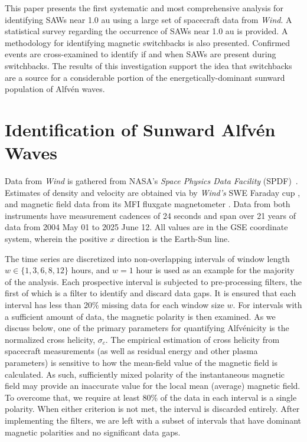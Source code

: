 \documentclass[twocolumn, times]{aastex631}
\begin{document}
This paper presents the first systematic and most comprehensive analysis for identifying SAWs near 1.0 au using a large set of spacecraft data from \emph{Wind}. A statistical survey regarding the occurrence of SAWs near 1.0 au is provided. A methodology for identifying magnetic switchbacks is also presented. Confirmed events are cross-examined to identify if and when SAWs are present during switchbacks. The results of this investigation support the idea that switchbacks are a source for a considerable portion of the energetically-dominant sunward population of Alfv\'en waves.

\section{Identification of Sunward Alfv\'en Waves} \label{sec:alfven}
Data from \emph{Wind} is gathered from NASA's \emph{Space Physics Data Facility} (SPDF)~\citep{papitashvili20}. Estimates of density and velocity are obtained via by \emph{Wind's} SWE Faraday cup \citep{lin95}, and magnetic field data from its MFI fluxgate magnetometer \citep{lepping95}. Data from both instruments have measurement cadences of 24 seconds and span over 21 years of data from 2004 May 01 to 2025 June 12. All values are in the GSE coordinate system, wherein the positive $x$ direction is the Earth-Sun line.

The time series are discretized into non-overlapping intervals of window length $w \in \{1, 3, 6, 8, 12\}$ hours, and $w = 1$ hour is used as an example for the majority of the analysis. Each prospective interval is subjected to pre-processing filters, the first of which is a filter to identify and discard data gaps. It is ensured that each interval has less than 20\% missing data for each window size $w$. For intervals with a sufficient amount of data, the magnetic polarity is then examined. As we discuss below, one of the primary parameters for quantifying Alfv\'enicity is the normalized cross helicity, $\sigma_c$. The empirical estimation of cross helicity from spacecraft measurements (as well as residual energy and other plasma parameters) is sensitive to how the mean-field value of the magnetic field is calculated. As such, sufficiently mixed polarity of the instantaneous magnetic field may provide an inaccurate value for the local mean (average) magnetic field. To overcome that, we require at least 80\% of the data in each interval is a single polarity. When either criterion is not met, the interval is discarded entirely. After implementing the filters, we are left with a subset of intervals that have dominant magnetic polarities and no significant data gaps.
\end{document}
